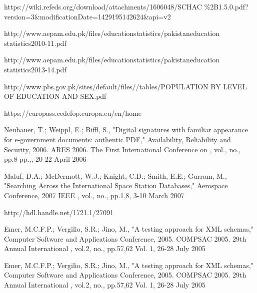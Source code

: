 \documentclass[12pt,a4paper,oneside]{book}
\begin{document}
\begin{thebibliography}{10}
https://wiki.refeds.org/download/attachments/1606048/SCHAC
\%2B1.5.0.pdf?version=3\&modificationDate=1429195142624\&api=v2

http://www.aepam.edu.pk/files/educationstatistics/pakistaneducation
statistics2010-11.pdf

http://www.aepam.edu.pk/files/educationstatistics/pakistaneducation
statistics2013-14.pdf

http://www.pbs.gov.pk/sites/default/files//tables/POPULATION BY LEVEL OF EDUCATION AND SEX.pdf

https://europass.cedefop.europa.eu/en/home

Neubauer, T.; Weippl, E.; Biffl, S., "Digital signatures with familiar appearance for e-government documents: authentic PDF," Availability, Reliability and Security, 2006. ARES 2006. The First International Conference on , vol., no., pp.8 pp.,, 20-22 April 2006

Maluf, D.A.; McDermott, W.J.; Knight, C.D.; Smith, E.E.; Gurram, M., "Searching Across the International Space Station Databases," Aerospace Conference, 2007 IEEE , vol., no., pp.1,8, 3-10 March 2007

http://hdl.handle.net/1721.1/27091

Emer, M.C.F.P.; Vergilio, S.R.; Jino, M., "A testing approach for XML schemas," Computer Software and Applications Conference, 2005. COMPSAC 2005. 29th Annual International , vol.2, no., pp.57,62 Vol. 1, 26-28 July 2005

Emer, M.C.F.P.; Vergilio, S.R.; Jino, M., "A testing approach for XML schemas," Computer Software and Applications Conference, 2005. COMPSAC 2005. 29th Annual International , vol.2, no., pp.57,62 Vol. 1, 26-28 July 2005

\end{thebibliography}
\end{document}
